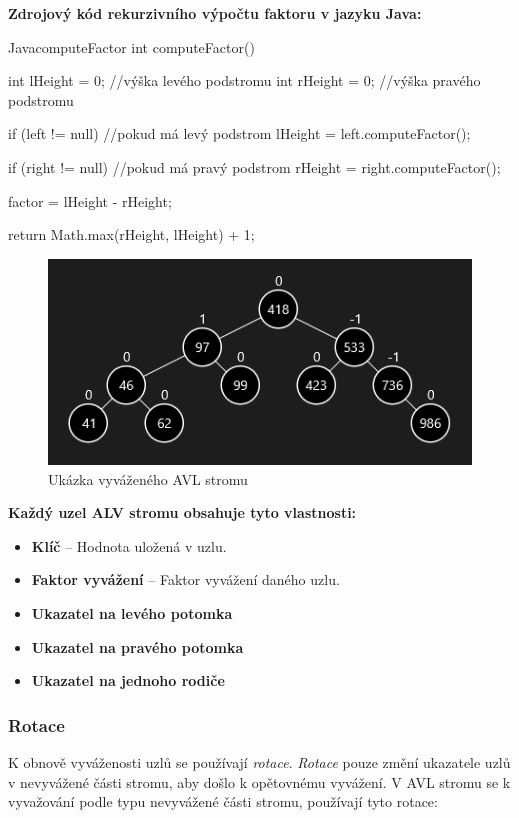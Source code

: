 \documentclass[
  biblatex=false,
  font=serif,
  glossaries=false,
  tables=false,
  theorems=false,
  index
]{kidiplom}
\begin{document}
\newpage\noindent \textbf{Zdrojový kód rekurzivního výpočtu faktoru v jazyku Java:}

\begin{kicode}{Java}{}{computeFactor}
int computeFactor() {		
	int lHeight = 0; //výška levého podstromu
	int rHeight = 0; //výška pravého podstromu
		
	if (left != null) { //pokud má levý podstrom
		lHeight = left.computeFactor();
	}
		
	if (right != null) { //pokud má pravý podstrom
		rHeight = right.computeFactor();
	}		
		
	factor = lHeight - rHeight; 
		
	return Math.max(rHeight, lHeight) + 1;		
}
\end{kicode} 

\begin{figure}[h!]
\centering
	\includegraphics[scale=1]{obrazky/10AVLUkazka.png}
	\caption{Ukázka vyváženého AVL stromu}
\end{figure}


\noindent\textbf{Každý uzel ALV stromu obsahuje tyto vlastnosti:}
\begin{itemize}
\item \textbf{Klíč} -- Hodnota uložená v uzlu.
\item \textbf{Faktor vyvážení} -- Faktor vyvážení daného uzlu.
\item \textbf{Ukazatel na levého potomka}
\item \textbf{Ukazatel na pravého potomka}
\item \textbf{Ukazatel na jednoho rodiče}
\end{itemize}

\subsubsection{Rotace}
\indent\indent K obnově vyváženosti uzlů se používají \textit{rotace}. \textit{Rotace} pouze změní ukazatele uzlů v nevyvážené části stromu, aby došlo k opětovnému vyvážení. V AVL stromu se k vyvažování podle typu nevyvážené části stromu, používají tyto rotace:\\
\end{document}

